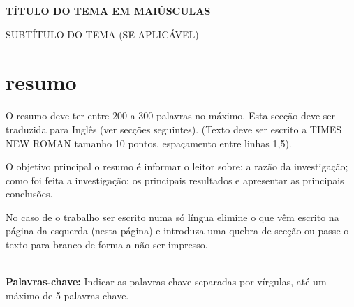 \begingroup
\begin{flushleft}
\bfseries
{}
{\fontsize{14}{16.8}\selectfont
		TÍTULO DO TEMA EM MAIÚSCULAS}

\mdseries		%
{\fontsize{14}{16.8}\selectfont 
		SUBTÍTULO DO TEMA (SE APLICÁVEL)}
\end{flushleft}
\normalsize
\let\clearpage\relax

\chapter{resumo}
\endgroup

O resumo deve ter entre 200 a 300 palavras no máximo. Esta secção deve ser traduzida para Inglês (ver secções seguintes).  (Texto deve ser escrito a TIMES NEW ROMAN tamanho 10 pontos, espaçamento entre linhas 1,5).

O objetivo principal o resumo é informar o leitor sobre: a razão da investigação; como foi feita a investigação; os principais resultados e apresentar as principais conclusões.
 
No caso de o trabalho ser escrito numa só língua elimine o que vêm escrito na página da esquerda (nesta página) e introduza uma quebra de secção ou passe o texto para branco de forma a não ser impresso.






\hspace{3cm}\\		%
\indent				%
 \textbf{Palavras-chave: } Indicar as palavras-chave separadas por vírgulas, até um máximo de 5 palavras-chave.
